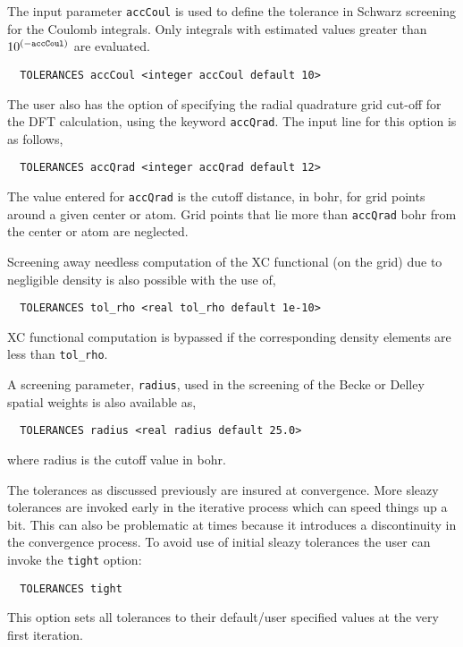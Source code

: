 The input
parameter {\tt accCoul} is used to define the tolerance in Schwarz 
screening for the Coulomb integrals.  Only integrals with estimated
values greater than $10^{(-{\tt accCoul})}$ are evaluated.

\begin{verbatim}
  TOLERANCES accCoul <integer accCoul default 10>
\end{verbatim}

The user also has the option of specifying the radial quadrature 
grid cut-off for the DFT calculation, using the keyword
\verb+accQrad+.  The input line for this option is as follows,
\begin{verbatim}
  TOLERANCES accQrad <integer accQrad default 12>
\end{verbatim}

The value entered for \verb+accQrad+ is the cutoff distance, in bohr, for grid
points around a given center or atom.  Grid points that lie more than 
\verb+accQrad+ bohr from the center or atom are neglected. 

Screening away needless computation of the XC functional (on the grid)
due to negligible density is also possible with the use of,
\begin{verbatim}
  TOLERANCES tol_rho <real tol_rho default 1e-10>
\end{verbatim}
XC functional computation is bypassed if the corresponding density
elements are less than \verb+tol_rho+.

A screening parameter, \verb+radius+, used in the screening of the
Becke or Delley spatial weights is also available as,
\begin{verbatim}
  TOLERANCES radius <real radius default 25.0>
\end{verbatim}
where radius is the cutoff value in bohr.

The tolerances as discussed previously are insured at convergence.
More sleazy tolerances are invoked early in the iterative process
which can speed things up a bit.  This can also be problematic at
times because it introduces a discontinuity in the convergence
process.  To avoid use of initial sleazy tolerances the user can
invoke the \verb+tight+ option:

\begin{verbatim}
  TOLERANCES tight 
\end{verbatim}

This option sets all tolerances to their
default/user specified values at the very first iteration.


